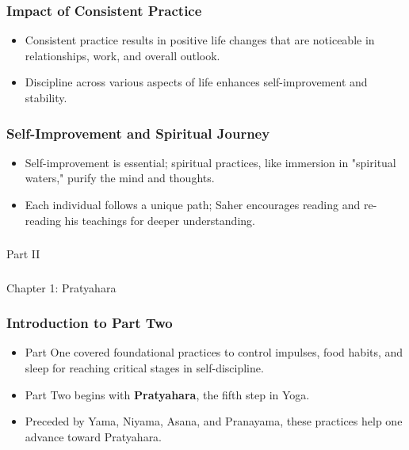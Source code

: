 \begin{frame}[fragile]\frametitle{Impact of Consistent Practice}
    \begin{itemize}
        \item Consistent practice results in positive life changes that are noticeable in relationships, work, and overall outlook.
        \item Discipline across various aspects of life enhances self-improvement and stability.
    \end{itemize}
\end{frame}

\begin{frame}[fragile]\frametitle{Self-Improvement and Spiritual Journey}
    \begin{itemize}
        \item Self-improvement is essential; spiritual practices, like immersion in "spiritual waters," purify the mind and thoughts.
        \item Each individual follows a unique path; Saher encourages reading and re-reading his teachings for deeper understanding.
    \end{itemize}
\end{frame}



\begin{frame}[fragile]\frametitle{}
\begin{center}
{\Large Part II}
\end{center}
\end{frame}

\begin{frame}[fragile]\frametitle{}
\begin{center}
{\Large Chapter 1: Pratyahara }
\end{center}
\end{frame}


\begin{frame}[fragile]\frametitle{Introduction to Part Two}
    \begin{itemize}
        \item Part One covered foundational practices to control impulses, food habits, and sleep for reaching critical stages in self-discipline.
        \item Part Two begins with \textbf{Pratyahara}, the fifth step in Yoga.
        \item Preceded by Yama, Niyama, Asana, and Pranayama, these practices help one advance toward Pratyahara.
    \end{itemize}
\end{frame}

